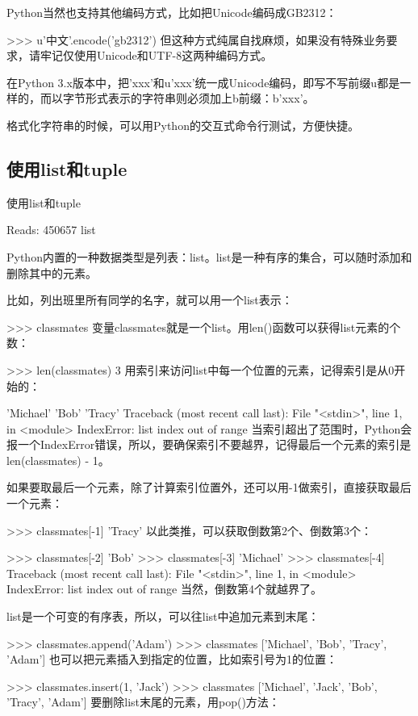 Python当然也支持其他编码方式，比如把Unicode编码成GB2312：

>>> u'中文'.encode('gb2312')
但这种方式纯属自找麻烦，如果没有特殊业务要求，请牢记仅使用Unicode和UTF-8这两种编码方式。

在Python 3.x版本中，把'xxx'和u'xxx'统一成Unicode编码，即写不写前缀u都是一样的，而以字节形式表示的字符串则必须加上b前缀：b'xxx'。

格式化字符串的时候，可以用Python的交互式命令行测试，方便快捷。


\subsection{使用list和tuple}

使用list和tuple

Reads: 450657
list

Python内置的一种数据类型是列表：list。list是一种有序的集合，可以随时添加和删除其中的元素。

比如，列出班里所有同学的名字，就可以用一个list表示：

>>> classmates
变量classmates就是一个list。用len()函数可以获得list元素的个数：

>>> len(classmates)
3
用索引来访问list中每一个位置的元素，记得索引是从0开始的：

'Michael'
'Bob'
'Tracy'
Traceback (most recent call last):
  File "<stdin>", line 1, in <module>
IndexError: list index out of range
当索引超出了范围时，Python会报一个IndexError错误，所以，要确保索引不要越界，记得最后一个元素的索引是len(classmates) - 1。

如果要取最后一个元素，除了计算索引位置外，还可以用-1做索引，直接获取最后一个元素：

>>> classmates[-1]
'Tracy'
以此类推，可以获取倒数第2个、倒数第3个：

>>> classmates[-2]
'Bob'
>>> classmates[-3]
'Michael'
>>> classmates[-4]
Traceback (most recent call last):
  File "<stdin>", line 1, in <module>
IndexError: list index out of range
当然，倒数第4个就越界了。

list是一个可变的有序表，所以，可以往list中追加元素到末尾：

>>> classmates.append('Adam')
>>> classmates
['Michael', 'Bob', 'Tracy', 'Adam']
也可以把元素插入到指定的位置，比如索引号为1的位置：

>>> classmates.insert(1, 'Jack')
>>> classmates
['Michael', 'Jack', 'Bob', 'Tracy', 'Adam']
要删除list末尾的元素，用pop()方法：

